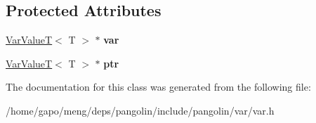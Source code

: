 \subsection*{Protected Attributes}
\begin{DoxyCompactItemize}
\item 
\hyperlink{classpangolin_1_1_var_value_t}{Var\+ValueT}$<$ T $>$ $\ast$ {\bfseries var}\hypertarget{classpangolin_1_1_var_ae40747fbc28ddcb3ac47a0cd60ba1b7c}{}\label{classpangolin_1_1_var_ae40747fbc28ddcb3ac47a0cd60ba1b7c}

\item 
\hyperlink{classpangolin_1_1_var_value_t}{Var\+ValueT}$<$ T $>$ $\ast$ {\bfseries ptr}\hypertarget{classpangolin_1_1_var_adc45d72e50bbc3bf652c8a1d64eaa388}{}\label{classpangolin_1_1_var_adc45d72e50bbc3bf652c8a1d64eaa388}

\end{DoxyCompactItemize}


The documentation for this class was generated from the following file\+:\begin{DoxyCompactItemize}
\item 
/home/gapo/meng/deps/pangolin/include/pangolin/var/var.\+h\end{DoxyCompactItemize}
